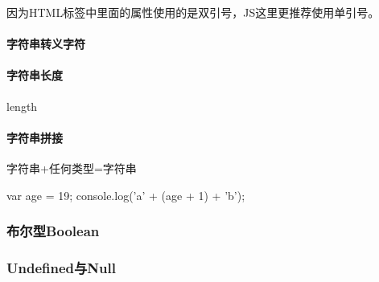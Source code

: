 因为HTML标签中里面的属性使用的是双引号，JS这里更推荐使用单引号。
\paragraph{字符串转义字符}
\paragraph{字符串长度}
length
\paragraph{字符串拼接}
字符串+任何类型=字符串
\begin{js}
var age = 19;
console.log('a' + (age + 1) + 'b');
\end{js}

\subsubsection{布尔型Boolean}
\subsubsection{Undefined与Null}





